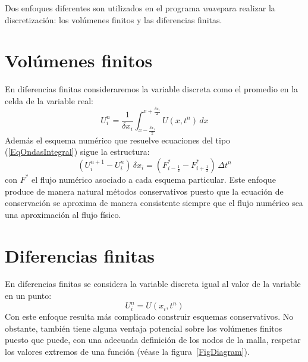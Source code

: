 \documentclass[a4paper,10pt]{report}
\newcommand{\EQ}[2]{\begin{equation}#1\label{#2}\end{equation}}
\newcommand{\PA}[1]{\left(#1\right)}
\newcommand{\IX}{\delta x}
\newcommand{\WAVE}{\emph{wave}}
\begin{document}
Dos enfoques diferentes son utilizados en el programa \WAVE para realizar la discretización: los volúmenes finitos y las diferencias finitas.

\section{Volúmenes finitos}

En diferencias finitas consideraremos la variable discreta como el promedio en la celda de la variable real:
\EQ
{
	U_i^n=
	\frac{1}{\IX_i}\int_{x-\frac{\IX_i}{2}}^{x+\frac{\IX_i}{2}}U\PA{x,t^n}\,dx
}{EqMallaIntegral}
Además el esquema numérico que resuelve ecuaciones del tipo
(\ref{EqOndasIntegral}) sigue la estructura:
\EQ
{
	\PA{U_i^{n+1}-U_i^n}\,\delta x_i
	=\PA{F_{i-\frac12}^*-F_{i+\frac12}^*}\,\Delta t^n
}{EqVolumenesFinitos}
con $F^*$ el flujo numérico asociado a cada esquema particular. Este enfoque produce de manera natural métodos conservativos puesto que la ecuación de conservación se aproxima de manera consistente siempre que el flujo numérico sea una aproximación al flujo físico.

\section{Diferencias finitas}

En diferencias finitas se considera la variable discreta igual al valor de la variable en un punto:
\EQ{U_i^n=U\PA{x_i,t^n}}{EqMallaDiscreta}
Con este enfoque resulta más complicado construir esquemas conservativos. No obstante, también tiene alguna ventaja potencial sobre los volúmenes finitos puesto que puede, con una adecuada definición de los nodos de la malla, respetar los valores extremos de una función (véase la figura~\ref{FigDiagram}).
\end{document}

